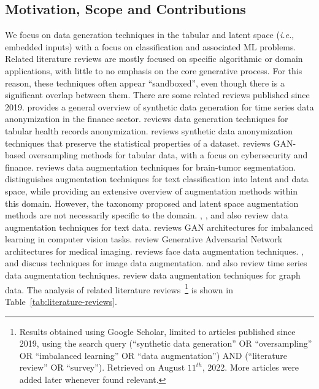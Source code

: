 \subsection{Motivation, Scope and Contributions}

We focus on data generation techniques in the tabular and latent space
(\textit{i.e.}, embedded inputs) with a focus on classification and associated
ML problems. Related literature reviews are mostly focused on specific
algorithmic or domain applications, with little to no emphasis on the core
generative process. For this reason, these techniques often appear
``sandboxed'', even though there is a significant overlap between them. There
are some related reviews published since 2019. \cite{assefa2020generating}
provides a general overview of synthetic data generation for time series data
anonymization in the finance sector. \cite{hernandez2022synthetic} reviews
data generation techniques for tabular health records anonymization.
\cite{raghunathan2021synthetic} reviews synthetic data anonymization
techniques that preserve the statistical properties of a dataset.
\cite{sauber2022use} reviews GAN-based oversampling methods for tabular
data, with a focus on cybersecurity and finance. \cite{nalepa2019data}
reviews data augmentation techniques for brain-tumor segmentation.
\cite{bayer2021survey} distinguishes augmentation techniques for text
classification into latent and data space, while providing an extensive
overview of augmentation methods within this domain. However, the taxonomy
proposed and latent space augmentation methods are not necessarily specific to
the domain. \cite{shorten2021text}, \cite{chen2021empirical},
\cite{feng2021survey} and \cite{liu2020survey} also review data augmentation
techniques for text data. \cite{sampath2021survey} reviews GAN
architectures for imbalanced learning in computer vision tasks.
\cite{yi2019generative} review Generative Adversarial Network architectures
for medical imaging. \cite{wang2020survey} reviews face data augmentation
techniques. \cite{shorten2019survey}, \cite{khosla2020enhancing} and
\cite{khalifa2021comprehensive} discuss techniques for image data
augmentation.  \cite{iwana2021empirical} and \cite{wen2020time} also review
time series data augmentation techniques.  \cite{zhao2022graph} review data
augmentation techniques for graph data. The analysis of related literature
reviews~\footnote{Results obtained using Google Scholar, limited to articles
    published since 2019, using the search query {\selectfont
        (``synthetic data generation'' OR ``oversampling'' OR ``imbalanced
        learning'' OR ``data augmentation'') AND (``literature review'' OR
``survey'')}. Retrieved on August $11^{th}$, 2022. More articles were added
later whenever found relevant.  } is shown in
Table~\ref{tab:literature-reviews}.

